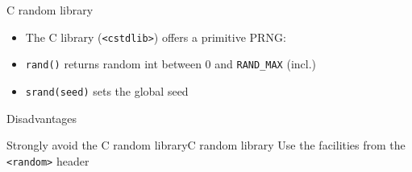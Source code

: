 \begin{frame}[fragile]
  \begin{block}{C random library}
    \begin{itemize}
      \item The C library (\texttt{<cstdlib>}) offers a primitive PRNG:
      \item \texttt{rand()} returns random int between 0 and \texttt{RAND_MAX} (incl.)
      \item \texttt{srand(seed)} sets the global seed
    \end{itemize}
  \end{block}
  \begin{alertblock}{Disadvantages}
  \end{alertblock}
  \begin{goodpracticeWithShortcut}{Strongly avoid the C random library}{C random library}
    Use the  facilities from the \texttt{<random>} header
  \end{goodpracticeWithShortcut}
\end{frame}
